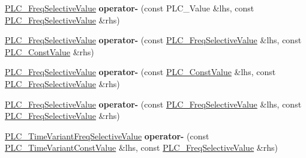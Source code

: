 \begin{DoxyCompactItemize}
\item 
\hypertarget{classns3_1_1PLC__FreqSelectiveValue_ac983a169bad88bbd1c9d67963f341667}{\hyperlink{classns3_1_1PLC__FreqSelectiveValue}{\-P\-L\-C\-\_\-\-Freq\-Selective\-Value} {\bfseries operator-\/} (const \-P\-L\-C\-\_\-\-Value \&lhs, const \hyperlink{classns3_1_1PLC__FreqSelectiveValue}{\-P\-L\-C\-\_\-\-Freq\-Selective\-Value} \&rhs)}\label{classns3_1_1PLC__FreqSelectiveValue_ac983a169bad88bbd1c9d67963f341667}

\item 
\hypertarget{classns3_1_1PLC__FreqSelectiveValue_ac355559b2fb991a6da6122f090fca681}{\hyperlink{classns3_1_1PLC__FreqSelectiveValue}{\-P\-L\-C\-\_\-\-Freq\-Selective\-Value} {\bfseries operator-\/} (const \hyperlink{classns3_1_1PLC__FreqSelectiveValue}{\-P\-L\-C\-\_\-\-Freq\-Selective\-Value} \&lhs, const \hyperlink{classns3_1_1PLC__ConstValue}{\-P\-L\-C\-\_\-\-Const\-Value} \&rhs)}\label{classns3_1_1PLC__FreqSelectiveValue_ac355559b2fb991a6da6122f090fca681}

\item 
\hypertarget{classns3_1_1PLC__FreqSelectiveValue_aa9ee019273c8fc22bd86d3b6210faa63}{\hyperlink{classns3_1_1PLC__FreqSelectiveValue}{\-P\-L\-C\-\_\-\-Freq\-Selective\-Value} {\bfseries operator-\/} (const \hyperlink{classns3_1_1PLC__ConstValue}{\-P\-L\-C\-\_\-\-Const\-Value} \&lhs, const \hyperlink{classns3_1_1PLC__FreqSelectiveValue}{\-P\-L\-C\-\_\-\-Freq\-Selective\-Value} \&rhs)}\label{classns3_1_1PLC__FreqSelectiveValue_aa9ee019273c8fc22bd86d3b6210faa63}

\item 
\hypertarget{classns3_1_1PLC__FreqSelectiveValue_a1d879b6e6cd1287246e44f1dd45e3f8c}{\hyperlink{classns3_1_1PLC__FreqSelectiveValue}{\-P\-L\-C\-\_\-\-Freq\-Selective\-Value} {\bfseries operator-\/} (const \hyperlink{classns3_1_1PLC__FreqSelectiveValue}{\-P\-L\-C\-\_\-\-Freq\-Selective\-Value} \&lhs, const \hyperlink{classns3_1_1PLC__FreqSelectiveValue}{\-P\-L\-C\-\_\-\-Freq\-Selective\-Value} \&rhs)}\label{classns3_1_1PLC__FreqSelectiveValue_a1d879b6e6cd1287246e44f1dd45e3f8c}

\item 
\hypertarget{classns3_1_1PLC__FreqSelectiveValue_a67c677f135b0983559bc0ac2960e4976}{\hyperlink{classns3_1_1PLC__TimeVariantFreqSelectiveValue}{\-P\-L\-C\-\_\-\-Time\-Variant\-Freq\-Selective\-Value} {\bfseries operator-\/} (const \hyperlink{classns3_1_1PLC__TimeVariantConstValue}{\-P\-L\-C\-\_\-\-Time\-Variant\-Const\-Value} \&lhs, const \hyperlink{classns3_1_1PLC__FreqSelectiveValue}{\-P\-L\-C\-\_\-\-Freq\-Selective\-Value} \&rhs)}\label{classns3_1_1PLC__FreqSelectiveValue_a67c677f135b0983559bc0ac2960e4976}


\end{DoxyCompactItemize}
